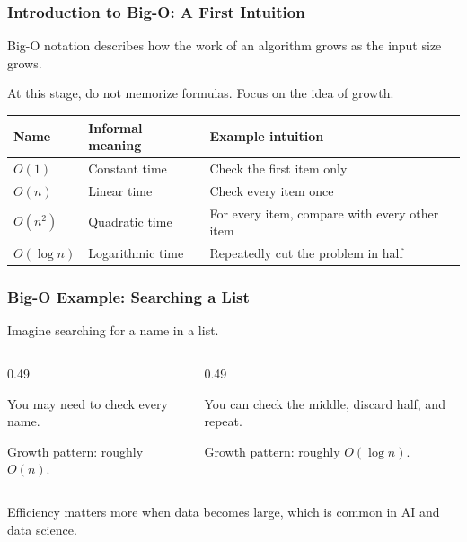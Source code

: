 \documentclass[aspectratio=169,10pt]{beamer}
\begin{document}
\begin{frame}
\frametitle{Introduction to Big-O: A First Intuition}
\vspace{0.90cm}
\begin{tcolorbox}[lecturebox,title=Key idea]
Big-O notation describes how the work of an algorithm grows as the input size grows.
\end{tcolorbox}
\vspace{0.18cm}
At this stage, do not memorize formulas. Focus on the idea of growth.
\vspace{0.05cm}
\renewcommand{\arraystretch}{1.06}
\begin{tabularx}{\textwidth}{>{\bfseries}p{2.8cm}p{3.45cm}X}
\toprule
Name & Informal meaning & Example intuition \\
\midrule
$O(1)$ & Constant time & Check the first item only \\
$O(n)$ & Linear time & Check every item once \\
$O(n^2)$ & Quadratic time & For every item, compare with every other item \\
$O(\log n)$ & Logarithmic time & Repeatedly cut the problem in half \\
\bottomrule
\end{tabularx}
\end{frame}


\begin{frame}
\frametitle{Big-O Example: Searching a List}
\vspace{0.72cm}
Imagine searching for a name in a list.
\vspace{0.35cm}
\begin{columns}[T,onlytextwidth]
\begin{column}{0.49\textwidth}
\begin{tcolorbox}[lecturebox,title=Unsorted list]
You may need to check every name.\par
Growth pattern: roughly $O(n)$.
\end{tcolorbox}
\end{column}
\begin{column}{0.49\textwidth}
\begin{tcolorbox}[lecturebox,title=Sorted list with smart search]
You can check the middle, discard half, and repeat.\par
Growth pattern: roughly $O(\log n)$.
\end{tcolorbox}
\end{column}
\end{columns}
\vspace{0.42cm}
\begin{tcolorbox}[lecturebox,title=Checkpoint]
Efficiency matters more when data becomes large, which is common in AI and data science.
\end{tcolorbox}
\end{frame}
\end{document}
